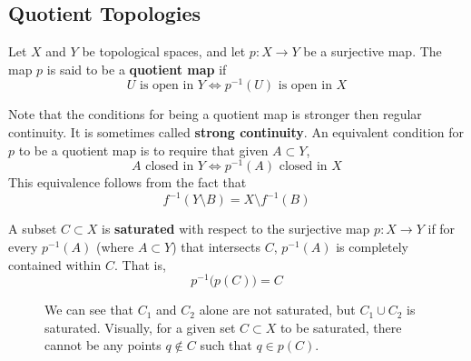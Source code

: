 \subsection{Quotient Topologies}

  \begin{definition}
    Let $X$ and $Y$ be topological spaces, and let $p: X \rightarrow Y$ be a surjective map. The map $p$ is said to be a \textbf{quotient map} if
    \begin{equation}
      U \text{ is open in } Y \iff p^{-1}(U) \text{ is open in } X
    \end{equation}
  \end{definition}

  Note that the conditions for being a quotient map is stronger then regular continuity. It is sometimes called \textbf{strong continuity}. An equivalent condition for $p$ to be a quotient map is to require that given $A \subset Y$, 
  \begin{equation}
    A \text{ closed in } Y \iff p^{-1}(A) \text{ closed in } X
  \end{equation}
  This equivalence follows from the fact that
  \begin{equation}
    f^{-1}(Y \setminus B) = X \setminus f^{-1}(B)
  \end{equation}

  \begin{definition}[Saturation]
    A subset $C \subset X$ is \textbf{saturated} with respect to the surjective map $p: X \rightarrow Y$ if for every $p^{-1} (A)$ (where $A \subset Y$) that intersects $C$, $p^{-1}(A)$ is completely contained within $C$. That is, 
    \begin{equation}
      p^{-1} \big( p(C) \big) = C
    \end{equation}

    \begin{figure}[H]
      \centering 
      \caption{We can see that $C_1$ and $C_2$ alone are not saturated, but $C_1 \cup C_2$ is saturated. Visually, for a given set $C \subset X$ to be saturated, there cannot be any points $q \not\in C$ such that $q \in p(C)$. }
      \label{fig:saturation}
    \end{figure}
  \end{definition}


